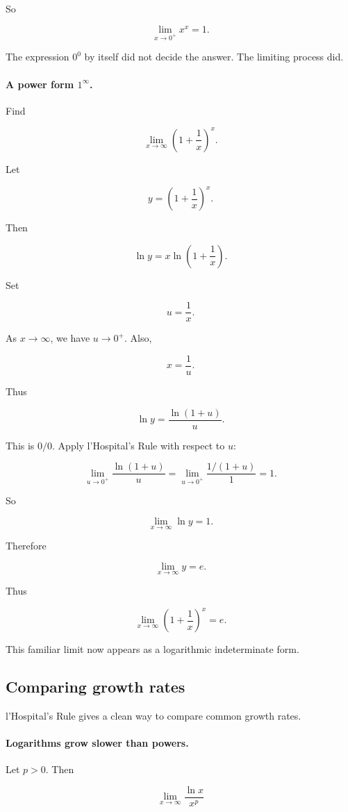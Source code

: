 So

\[
\boxed{
\lim_{x\to0^+}x^x=1.
}
\]

The expression \(0^0\) by itself did not decide the answer.  The limiting process did.

\paragraph{A power form \(1^\infty\).}
Find

\[
\lim_{x\to\infty}\left(1+\frac1x\right)^x.
\]

Let

\[
y=\left(1+\frac1x\right)^x.
\]

Then

\[
\ln y=x\ln\left(1+\frac1x\right).
\]

Set

\[
u=\frac1x.
\]

As \(x\to\infty\), we have \(u\to0^+\).  Also,

\[
x=\frac1u.
\]

Thus

\[
\ln y
=
\frac{\ln(1+u)}{u}.
\]

This is \(0/0\).  Apply l'Hospital's Rule with respect to \(u\):

\[
\lim_{u\to0^+}\frac{\ln(1+u)}{u}
=
\lim_{u\to0^+}\frac{1/(1+u)}{1}
=
1.
\]

So

\[
\lim_{x\to\infty}\ln y=1.
\]

Therefore

\[
\lim_{x\to\infty}y=e.
\]

Thus

\[
\boxed{
\lim_{x\to\infty}\left(1+\frac1x\right)^x=e.
}
\]

This familiar limit now appears as a logarithmic indeterminate form.

\subsection{Comparing growth rates}
\label{subsec:comparing-growth-rates}

l'Hospital's Rule gives a clean way to compare common growth rates.

\paragraph{Logarithms grow slower than powers.}
Let \(p>0\).  Then

\[
\lim_{x\to\infty}\frac{\ln x}{x^p}
\]

